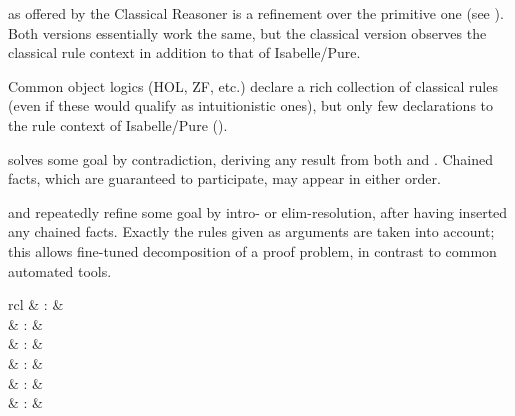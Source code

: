 \begin{isabellebody}
\begin{isamarkuptext}
  \begin{descr}

  \item [\hyperlink{method.rule}{\mbox{\isa{rule}}}] as offered by the Classical Reasoner is a
  refinement over the primitive one (see ).
  Both versions essentially work the same, but the classical version
  observes the classical rule context in addition to that of
  Isabelle/Pure.

  Common object logics (HOL, ZF, etc.) declare a rich collection of
  classical rules (even if these would qualify as intuitionistic
  ones), but only few declarations to the rule context of
  Isabelle/Pure ().

  \item [\hyperlink{method.contradiction}{\mbox{\isa{contradiction}}}] solves some goal by contradiction,
  deriving any result from both  and .  Chained
  facts, which are guaranteed to participate, may appear in either
  order.

  \item [\hyperlink{method.intro}{\mbox{\isa{intro}}} and \hyperlink{method.elim}{\mbox{\isa{elim}}}] repeatedly refine some
  goal by intro- or elim-resolution, after having inserted any chained
  facts.  Exactly the rules given as arguments are taken into account;
  this allows fine-tuned decomposition of a proof problem, in contrast
  to common automated tools.

  \end{descr}%
\end{isamarkuptext}%
\isamarkuptrue%
%
\isamarkuptrue%
%
\begin{isamarkuptext}%
\begin{matharray}{rcl}
    \hypertarget{method.blast}{\hyperlink{method.blast}{\mbox{}}} & : & \isarmeth \\
    \hypertarget{method.fast}{\hyperlink{method.fast}{\mbox{}}} & : & \isarmeth \\
    \hypertarget{method.slow}{\hyperlink{method.slow}{\mbox{}}} & : & \isarmeth \\
    \hypertarget{method.best}{\hyperlink{method.best}{\mbox{}}} & : & \isarmeth \\
    \hypertarget{method.safe}{\hyperlink{method.safe}{\mbox{}}} & : & \isarmeth \\
    \hypertarget{method.clarify}{\hyperlink{method.clarify}{\mbox{}}} & : & \isarmeth \\
  \end{matharray}


\end{isamarkuptext}
\end{isabellebody}
